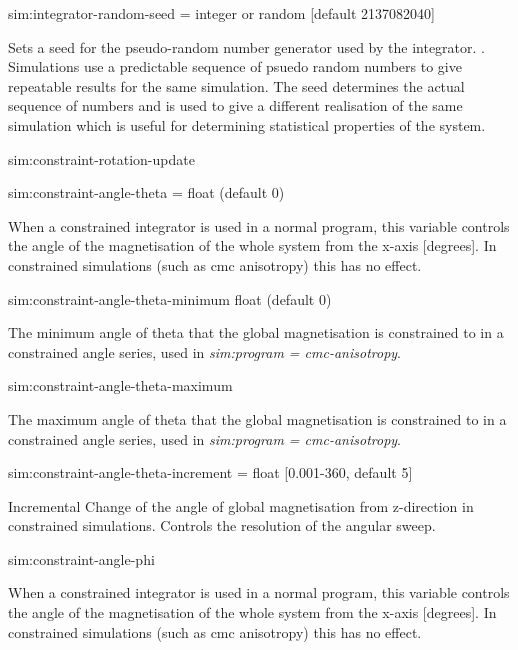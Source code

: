 

{\zicf sim:integrator-random-seed = integer or random [default 2137082040]} Sets a seed for the pseudo-random number generator used by the integrator. . Simulations use a predictable sequence of psuedo random numbers to give repeatable results for the same simulation. The seed determines the actual sequence of numbers and is used to give a different realisation of the same simulation which is useful for determining statistical properties of the system.

{\zicf sim:constraint-rotation-update}

{\zicf sim:constraint-angle-theta = float (default 0)} When a constrained integrator is used in a normal program, this variable controls the angle of the magnetisation of the whole system from the x-axis [degrees]. In constrained simulations (such as cmc anisotropy) this has no effect.

{\zicf  sim:constraint-angle-theta-minimum float (default 0)}   The minimum angle of theta that the global magnetisation is constrained to in a constrained angle series, used in \textit{sim:program = cmc-anisotropy}.

{\zicf  sim:constraint-angle-theta-maximum} The maximum angle of theta that the global magnetisation is constrained to in a constrained angle series, used in \textit{sim:program = cmc-anisotropy}.

{\zicf  sim:constraint-angle-theta-increment = float [0.001-360, default 5]} Incremental Change of the angle of global magnetisation from z-direction in constrained simulations. Controls the resolution of the angular sweep.

{\zicf sim:constraint-angle-phi} When a constrained integrator is used in a normal program, this variable controls the angle of the magnetisation of the whole system from the x-axis [degrees]. In constrained simulations (such as cmc anisotropy) this has no effect.

